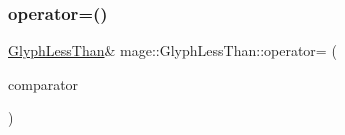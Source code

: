 \hypertarget{structmage_1_1_glyph_less_than_aeee354f70d70e708e7478066c38166b2}{}\label{structmage_1_1_glyph_less_than_aeee354f70d70e708e7478066c38166b2} 
\subsubsection{\texorpdfstring{operator=()}{operator=()}\hspace{0.1cm}{\footnotesize\ttfamily [2/2]}}
{\footnotesize\ttfamily \hyperlink{structmage_1_1_glyph_less_than}{Glyph\+Less\+Than}\& mage\+::\+Glyph\+Less\+Than\+::operator= (\begin{DoxyParamCaption}\item[{\hyperlink{structmage_1_1_glyph_less_than}{Glyph\+Less\+Than} \&\&}]{comparator }\end{DoxyParamCaption})\hspace{0.3cm}{\ttfamily [default]}}


